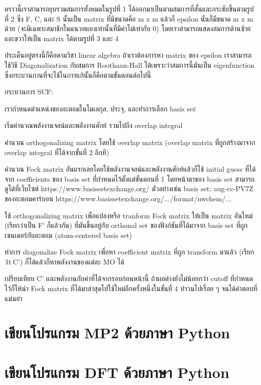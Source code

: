 คราวนี้เราสามารถยุบรวมสมการทั้งหมดในรูปที่ 1 ได้ออกมาเป็นตามสมการที่สั้นและกระชับขึ้นตามรูปที่ 2 ซึ่ง F, C, และ S นั้นเป็น matrix 
ที่มีขนาดคือ m x m แล้วก็ epsilon นั้นก็มีขนาด m x m ด้วย (จะมีเฉพาะสมาชิกในแนวทแยงเท่านั้นที่มีค่าไม่เท่ากับ 0) โดยเราสามารถแสดงสมการด้านซ้ายและขวาให้เป็น matrix ได้ตามรูปที่ 3 และ 4

ประเด็นอยู่ตรงนี้ก็คือตามวิชา linear algebra ถ้าเราต้องการหา matrix ของ epsilon เราสามารถใช้วิธี Diagonalization กับสมการ 
Roothaan-Hall ได้เพราะว่าสมการนี้มันเป็น eigenfunction ซึ่งกระบวนกานที่จะใช้ในการแก้นั้นก็คือตามขั้นตอนต่อไปนี้


กระบวนการ SCF:

เรากำหนดตำแหน่งของอะตอมในโมเลกุล, ประจุ, และทำการเลือก basis seะ

เริ่มคำนวณพลังงานจลน์และพลังงานศักย์ รวมไปถึง overlap integral

คำนวณ orthogonalizing matrix โดยใช้ overlap matrix (overlap matrix ที่ถูกสร้างมาจาก overlap integral ที่ได้จากขั้นที่ 2 อีกที)

คำนวณ Fock matrix อันแรกเลยโดยใช้พลังงานจลน์และพลังงานศักย์แล้วก็ใช้ initial guess ที่ได้จาก coefficients ของ basis set 
ที่กำหนดไว้ตั้งแต่ขั้นตอนที่ 1 โดยหน้าตาของ basis set สามารถดูได้ที่เว็บไซต์ https://www.basissetexchange.org/ ตัวอย่างเช่น 
basis set: aug-cc-PV7Z ของอะตอมคาร์บอน https://www.basissetexchange.org/.../format/nwchem/...

ใช้ orthogonalizing matrix เพื่อแปลงหรือ tranform Fock matrix ให้เป็น matrix อันใหม่ (เรียกว่าเป็น F' ก็แล้วกัน) ที่มันขึ้นอยู่กับ 
orthonal set ของฟังก์ชันที่ได้มาจาก basis set ที่ถูกเซนเตอร์กับอะตอม (atom-centered basis set)

ทำการ diagonalize Fock matrix เพื่อหา coefficient matrix ที่ถูก transform มาแล้ว (เรียกว่า C') ก็ได้แล้วก็หาพลังงานของแต่ละ MO ได้

เปรียบเทียบ C' และพลังงานกับค่าที่ได้จากรอบก่อนหน้านี้ ถ้าผลต่างยังไม่น้อยกว่า cutoff ที่กำหนดไว้ก็ให้นำ Fock matrix ที่ได้มาล่าสุดไปใช้ใหม่อีกครั้งหนึ่งในขั้นที่ 4 ทำวนไปเรื่อย ๆ จนได้คำตอบที่แม่นยำ

\section{เขียนโปรแกรม MP2 ด้วยภาษา Python}

\section{เขียนโปรแกรม DFT ด้วยภาษา Python}

